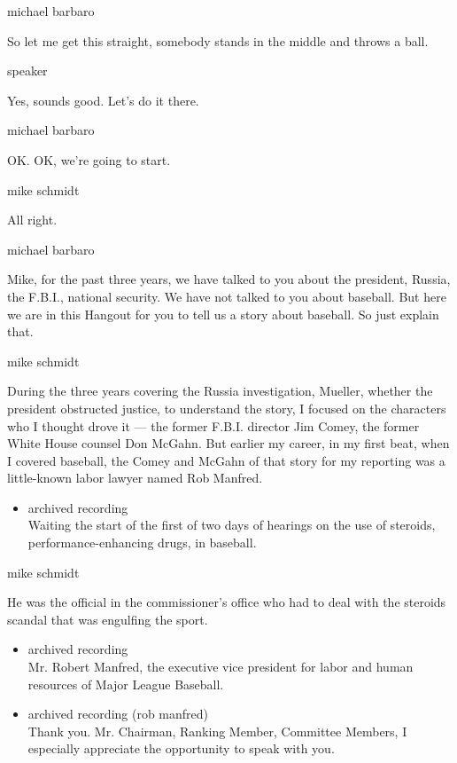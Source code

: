 michael barbaro

So let me get this straight, somebody stands in the middle and throws a
ball.

speaker

Yes, sounds good. Let's do it there.

michael barbaro

OK. OK, we're going to start.

mike schmidt

All right.

michael barbaro

Mike, for the past three years, we have talked to you about the
president, Russia, the F.B.I., national security. We have not talked to
you about baseball. But here we are in this Hangout for you to tell us a
story about baseball. So just explain that.

mike schmidt

During the three years covering the Russia investigation, Mueller,
whether the president obstructed justice, to understand the story, I
focused on the characters who I thought drove it --- the former F.B.I.
director Jim Comey, the former White House counsel Don McGahn. But
earlier my career, in my first beat, when I covered baseball, the Comey
and McGahn of that story for my reporting was a little-known labor
lawyer named Rob Manfred.

\begin{itemize}
\tightlist
\item
  archived recording\\
  Waiting the start of the first of two days of hearings on the use of
  steroids, performance-enhancing drugs, in baseball.
\end{itemize}

mike schmidt

He was the official in the commissioner's office who had to deal with
the steroids scandal that was engulfing the sport.

\begin{itemize}
\item
  archived recording\\
  Mr. Robert Manfred, the executive vice president for labor and human
  resources of Major League Baseball.
\item
  archived recording (rob manfred)\\
  Thank you. Mr. Chairman, Ranking Member, Committee Members, I
  especially appreciate the opportunity to speak with you.
\end{itemize}

